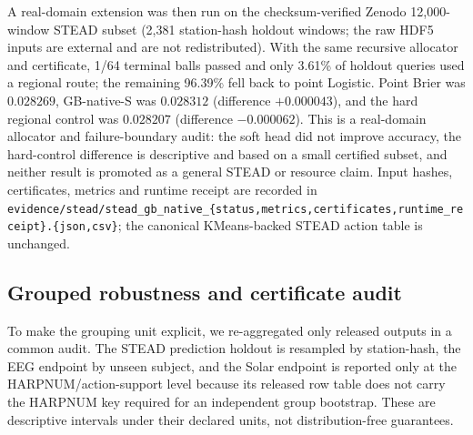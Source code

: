\documentclass[11pt,a4paper]{article}
\numberwithin{equation}{section}
\theoremstyle{definition}\newtheorem{definition}[theorem]{Definition}
\theoremstyle{remark}\newtheorem{remark}[theorem]{Remark}
\begin{document}
A real-domain extension was then run on the checksum-verified Zenodo 12,000-window STEAD subset (2,381 station-hash holdout windows; the raw HDF5 inputs are external and are not redistributed). With the same recursive allocator and certificate, 1/64 terminal balls passed and only 3.61\% of holdout queries used a regional route; the remaining 96.39\% fell back to point Logistic. Point Brier was $0.028269$, GB-native-S was $0.028312$ (difference $+0.000043$), and the hard regional control was $0.028207$ (difference $-0.000062$). This is a real-domain allocator and failure-boundary audit: the soft head did not improve accuracy, the hard-control difference is descriptive and based on a small certified subset, and neither result is promoted as a general STEAD or resource claim. Input hashes, certificates, metrics and runtime receipt are recorded in \texttt{evidence/stead/stead\_gb\_native\_\{status,metrics,certificates,runtime\_receipt\}.\{json,csv\}}; the canonical KMeans-backed STEAD action table is unchanged.


\subsection{Grouped robustness and certificate audit}\label{sec:group_robustness}
To make the grouping unit explicit, we re-aggregated only released outputs in a
common audit. The STEAD prediction holdout is resampled by station-hash, the
EEG endpoint by unseen subject, and the Solar endpoint is reported only at the
HARPNUM/action-support level because its released row table does not carry the
HARPNUM key required for an independent group bootstrap. These are descriptive
intervals under their declared units, not distribution-free guarantees.
\end{document}
